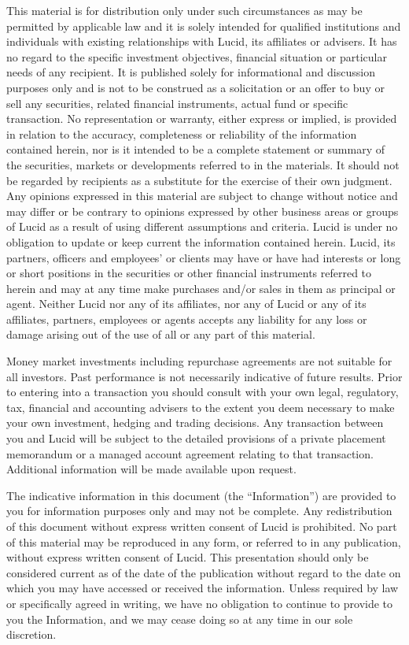 \documentclass[9pt]{article}
\begin{document}
    \noindent This material is for distribution only under such circumstances as may be permitted by applicable law and it is solely intended for qualified institutions and individuals with existing relationships with Lucid, its affiliates or advisers. It has no regard to the specific investment objectives, financial situation or particular needs of any recipient. It is published solely for informational and discussion purposes only and is not to be construed as a solicitation or an offer to buy or sell any securities, related financial instruments, actual fund or specific transaction. No representation or warranty, either express or implied, is provided in relation to the accuracy, completeness or reliability of the information contained herein, nor is it intended to be a complete statement or summary of the securities, markets or developments referred to in the materials. It should not be regarded by recipients as a substitute for the exercise of their own judgment. Any opinions expressed in this material are subject to change without notice and may differ or be contrary to opinions expressed by other business areas or groups of Lucid as a result of using different assumptions and criteria. Lucid is under no obligation to update or keep current the information contained herein. Lucid, its partners, officers and employees' or clients may have or have had interests or long or short positions in the securities or other financial instruments referred to herein and may at any time make purchases and/or sales in them as principal or agent. Neither Lucid nor any of its affiliates, nor any of Lucid or any of its affiliates, partners, employees or agents accepts any liability for any loss or damage arising out of the use of all or any part of this material.

    \noindent Money market investments including repurchase agreements are not suitable for all investors. Past performance is not necessarily indicative of future results. Prior to entering into a transaction you should consult with your own legal, regulatory, tax, financial and accounting advisers to the extent you deem necessary to make your own investment, hedging and trading decisions. Any transaction between you and Lucid will be subject to the detailed provisions of a private placement memorandum or a managed account agreement relating to that transaction. Additional information will be made available upon request.

    \noindent The indicative information in this document (the ``Information'') are provided to you for information purposes only and may not be complete. Any redistribution of this document without express written consent of Lucid is prohibited. No part of this material may be reproduced in any form, or referred to in any publication, without express written consent of Lucid. This presentation should only be considered current as of the date of the publication without regard to the date on which you may have accessed or received the information. Unless required by law or specifically agreed in writing, we have no obligation to continue to provide to you the Information, and we may cease doing so at any time in our sole discretion.
\end{document}

